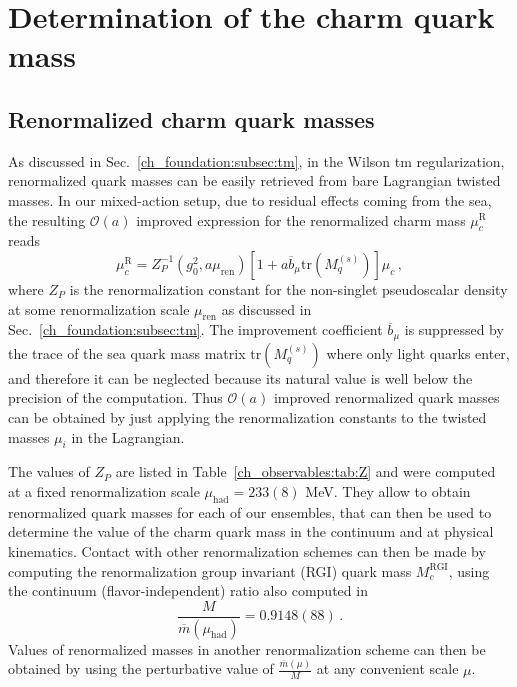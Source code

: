 \section{Determination of the charm quark mass}
\label{sec:mc}

\subsection{Renormalized charm quark masses}

%
As discussed in Sec.~\ref{ch_foundation:subsec:tm}, in the Wilson tm regularization, renormalized quark masses can be easily retrieved from bare Lagrangian twisted masses. In our mixed-action setup, due to residual effects coming from the sea, the resulting $\mathcal{O}(a)$ improved expression for the renormalized  charm mass $\mu^{\textrm{R}}_c$ reads
\begin{equation}
	\mu^{\textrm{R}}_c=Z_P^{-1}(g_0^2,a\mu_{\textrm{ren}})\left[1+a\overline{b}_\mu\textrm{tr}\left(M_q^{(s)}\right)\right]\mu_c\,,
	\label{eq:renormalized_charm_mass}
\end{equation}
where $Z_P$ is the renormalization constant for the non-singlet
pseudoscalar density at some renormalization scale $\mu_{\textrm{ren}}$ as discussed in Sec.~\ref{ch_foundation:subsec:tm}.
%
The improvement coefficient $\overline{b}_{\mu}$ is suppressed by the trace of the sea quark mass matrix $\textrm{tr}\left(M_q^{(s)}\right)$ where only light quarks enter, and therefore it can be neglected because its natural value is well below the precision of the computation. Thus $\mathcal{O}(a)$ improved renormalized quark masses can be obtained by just applying the renormalization constants to the twisted masses $\mu_i$ in the Lagrangian.
%

The values of $Z_P$ are listed in Table~\ref{ch_observables:tab:Z} and were computed at a fixed renormalization scale $\mu_{\textrm{had}}=233(8)$ MeV. They allow to obtain renormalized quark masses for each of our ensembles, that can then
be used to determine the value of the charm quark mass in the continuum and at physical kinematics.
%
Contact with other renormalization schemes can then be made by computing the renormalization
group invariant (RGI) quark mass $M_c^{\mathrm{RGI}}$, using the continuum (flavor-independent)
ratio also computed in~\cite{Campos:2018ahf}
\begin{equation}
	\frac{M}{\overline{m}(\mu_{\mathrm{had}})} = 0.9148(88)\,.
	\label{eq:rgi_running_factor}
\end{equation}
%
Values of renormalized masses in another renormalization scheme can then be obtained by
using the perturbative value of $\frac{\overline{m}(\mu)}{M}$ at any convenient scale $\mu$.
%

